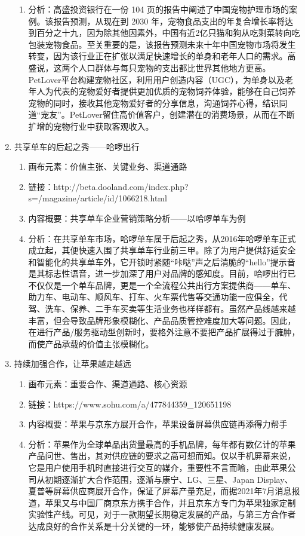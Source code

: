 \documentclass[a4paper]{ctexart}
\begin{document}
\begin{enumerate}[label=\alph*.]
\begin{enumerate}[label=\alph*.]
    \item 分析：高盛投资银行在一份 104 页的报告中阐述了中国宠物护理市场的案例。该报告预测，从现在到 2030 年，宠物食品支出的年复合增长率将达到百分之十九，因为除其他因素外，中国有近2亿只猫和狗从吃剩菜转向吃包装宠物食品。至关重要的是，该报告预测未来十年中国宠物市场将发生转变，因为该行业正在扩张以满足快速增长的单身和老年人口的需求。高盛说，这两个人口群体与每只宠物的支出都比世界其他地方更高。PetLover平台构建宠物社区，利用用户创造内容（UGC），为单身以及老年人为代表的宠物爱好者提供更加优质的宠物饲养体验，能够在自己饲养宠物的同时，接收其他宠物爱好者的分享信息，沟通饲养心得，结识同道“宠友”。PetLover留住高价值客户，创建潜在的消费场景，从而在不断扩增的宠物行业中获取客观收入。
  \end{enumerate}
  \item 共享单车的后起之秀——哈啰出行
  \begin{enumerate}[label=\alph*.]
    \item 画布元素：价值主张、关键业务、渠道通路
    \item 链接：http://beta.dooland.com/index.php?s=/magazine/article/id/1066218.html
    \item 内容概要：共享单车企业营销策略分析——以哈啰单车为例
    \item 分析：在共享单车市场，哈啰单车属于后起之秀，从2016年哈啰单车正式成立起，其便快速入围了共享单车行业前三甲。除了为用户提供舒适安全和智能化的共享单车外，它开锁时紧随“咔哒”声之后清脆的“hello”提示音是其标志性语音，进一步加深了用户对品牌的感知度。目前，哈啰出行已不仅仅是一个单车品牌，更是一个全流程公共出行方案提供商——单车、助力车、电动车、顺风车、打车、火车票代售等交通功能一应俱全，代驾、洗车、保养、二手车买卖等生活业务也样样都有。虽然产品线越来越丰富，但会导致品牌形象模糊化、产品品质管控难度加大等问题。因此，在进行产品/服务驱动型创新时，要格外注意不要把产品扩展得过于臃肿，而使产品承载的价值主张模糊化。
  \end{enumerate}
  \item 持续加强合作，让苹果越走越远
  \begin{enumerate}[label=\alph*.]
    \item 画布元素：重要合作、渠道通路、核心资源
    \item 链接：https://www.sohu.com/a/477844359\_120651198
    \item 内容概要：苹果与京东方展开合作，苹果设备屏幕供应链再添得力帮手
    \item 分析：苹果作为全球单品出货量最高的手机品牌，每年都有数亿计的苹果产品问世、售出，其对供应链的要求之高可想而知。仅以手机屏幕来说，它是用户使用手机时直接进行交互的媒介，重要性不言而喻，由此苹果公司从初期逐渐扩大合作范围，逐渐与康宁、LG、三星、Japan Display、夏普等屏幕供应商展开合作，保证了屏幕产量充足，而据2021年7月消息报道，苹果又与中国厂商京东方携手合作，并且京东方专门为苹果独家定制实验性产线。可见，对于一款期望长期稳定发展的产品，与第三方合作者达成良好的合作关系是十分关键的一环，能够使产品持续健康发展。

\end{enumerate}
\end{enumerate}
\end{document}
